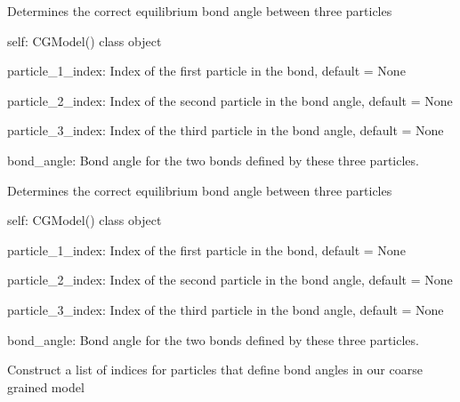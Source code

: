 \documentclass[letterpaper,12pt,english,openany,oneside]{sphinxmanual}
\begin{document}
\begin{fulllineitems}
\begin{fulllineitems}
\label{\detokenize{cg_model:cg_model.cgmodel.CGModel.get_bond_angle}}
Determines the correct equilibrium bond angle between three particles

self: CGModel() class object

particle\_1\_index: Index of the first particle in the bond, default = None

particle\_2\_index: Index of the second particle in the bond angle, default = None

particle\_3\_index: Index of the third particle in the bond angle, default = None

bond\_angle: Bond angle for the two bonds defined by these three particles.

\end{fulllineitems}


\begin{fulllineitems}
\label{\detokenize{cg_model:cg_model.cgmodel.CGModel.get_bond_angle_force_constant}}
Determines the correct equilibrium bond angle between three particles

self: CGModel() class object

particle\_1\_index: Index of the first particle in the bond, default = None

particle\_2\_index: Index of the second particle in the bond angle, default = None

particle\_3\_index: Index of the third particle in the bond angle, default = None

bond\_angle: Bond angle for the two bonds defined by these three particles.

\end{fulllineitems}


\begin{fulllineitems}
\label{\detokenize{cg_model:cg_model.cgmodel.CGModel.get_bond_angle_list}}
Construct a list of indices for particles that define bond angles in our coarse grained model


\end{fulllineitems}
\end{fulllineitems}
\end{document}
